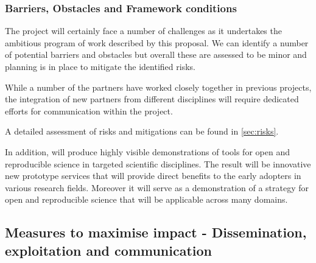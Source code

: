 \subsubsection{Barriers, Obstacles and Framework conditions}

The \TheProject project will certainly face a number of challenges as it undertakes
the ambitious program of work described by this proposal.
We can identify a number of potential barriers and obstacles but overall
these are assessed to be minor and planning is in place to mitigate the
identified risks.

While a number of the partners have worked closely together in previous projects,
the integration of new partners from different disciplines will require
dedicated efforts for communication within the project.

A detailed assessment of risks and mitigations can be found in \ref{sec:risks}.

In addition, \TheProject will produce highly visible demonstrations of
tools for open and reproducible science in targeted scientific disciplines.
The result will be innovative new prototype services that will provide
direct benefits to the early adopters in various research fields.
Moreover it will serve as a demonstration of a strategy for open and reproducible science
that will be applicable across many domains.

\subsection{Measures to maximise impact - Dissemination, exploitation and communication}

